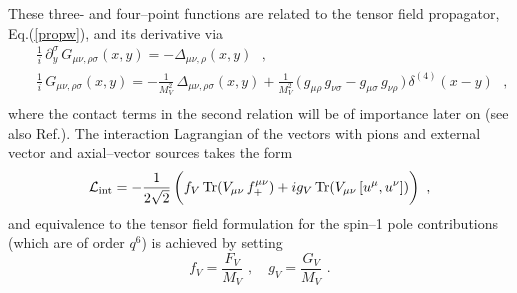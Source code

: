 These three- and four--point functions
 are related to the tensor field propagator, Eq.(\ref{propw}),
and its derivative via
\begin{eqnarray}
& &\frac{1}{i} \, \partial_y^\sigma \, G_{\mu \nu , \rho \sigma} ( x,y)
 = - \Delta_{\mu \nu ,  \rho} (x,y)
\, \, \, \, , \nonumber  \\
& &\frac{1}{i} \, G_{\mu \nu , \rho \sigma} ( x,y)  =
-\frac{1}{M_V^2} \, \Delta_{\mu \nu ,  \rho \sigma} (x,y)
+  \frac{1}{M_V^2} \, \bigl( \,g_{\mu \rho} \, g_{\nu \sigma}
 - g_{\mu \sigma} \, g_{\nu \rho} \, \bigr) \, \delta^{(4)}(x-y)
\nonumber \, \, \, \, ,\\ & &
\label{relat}
\end{eqnarray}
where the contact terms in the second relation will be of importance
later on (see also Ref.\cite{reso1}). The interaction Lagrangian of
the vectors with pions and external vector and axial--vector sources
takes the form
\begin{equation}
{\cal L}_{\rm int} = -\frac{1}{2\sqrt{2}} \, \biggl( f_V \, {\rm Tr} (
V_{\mu \nu} \, f_+^{\mu \nu} ) + i g_V \, {\rm Tr} (V_{\mu \nu} \, [
u^\mu , u^\nu] ) \biggr)
\, \, \, ,
\label{lvint}
\end{equation}
and equivalence to the tensor field formulation for the spin--1 pole
contributions (which are of order $q^6$) is achieved by setting \cite{reso1}
\begin{equation}
f_V = \frac{F_V}{M_V} \, \, , \quad g_V = \frac{G_V}{M_V} \, \, .
\label{equivmes}
\end{equation}

